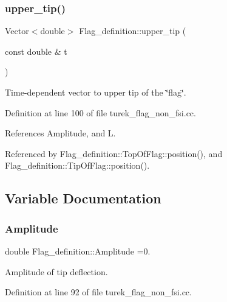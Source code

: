 \mbox{\label{namespaceFlag__definition_a6af3444eee77be503be4aa8c2ef47c13}} 
\subsubsection{\texorpdfstring{upper\+\_\+tip()}{upper\_tip()}}
{\footnotesize\ttfamily Vector$<$double$>$ Flag\+\_\+definition\+::upper\+\_\+tip (\begin{DoxyParamCaption}\item[{const double \&}]{t }\end{DoxyParamCaption})}



Time-\/dependent vector to upper tip of the \char`\"{}flag\char`\"{}. 



Definition at line 100 of file turek\+\_\+flag\+\_\+non\+\_\+fsi.\+cc.



References Amplitude, and L.



Referenced by Flag\+\_\+definition\+::\+Top\+Of\+Flag\+::position(), and Flag\+\_\+definition\+::\+Tip\+Of\+Flag\+::position().



\subsection{Variable Documentation}
\mbox{\label{namespaceFlag__definition_ad0eb269ec983b485aa24a6f2c25d2f5b}} 
\subsubsection{\texorpdfstring{Amplitude}{Amplitude}}
{\footnotesize\ttfamily double Flag\+\_\+definition\+::\+Amplitude =0.}



Amplitude of tip deflection. 



Definition at line 92 of file turek\+\_\+flag\+\_\+non\+\_\+fsi.\+cc.



